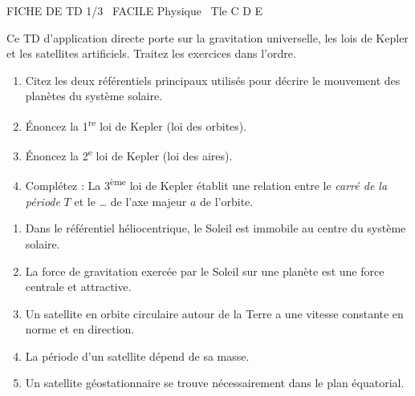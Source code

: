 \documentclass[11pt]{article}
\begin{document}
\begin{tcolorbox}[enhanced,colback=popink,colframe=popink,arc=10pt,boxrule=0pt,left=12pt,right=12pt,top=9pt,bottom=9pt]
{\color{white}\popxbold\small FICHE DE TD 1/3 \textbullet\ FACILE \hfill Physique \textbullet\ Tle C D E\par}
\end{tcolorbox}
\vspace{4pt}
Ce TD d'application directe porte sur la gravitation universelle, les lois de Kepler et les satellites artificiels. Traitez les exercices dans l'ordre.

\begin{exercice}
\begin{enumerate}
    \item Citez les deux référentiels principaux utilisés pour décrire le mouvement des planètes du système solaire.
    \item Énoncez la 1\textsuperscript{re} loi de Kepler (loi des orbites).
    \item Énoncez la 2\textsuperscript{e} loi de Kepler (loi des aires).
    \item Complétez : La 3\textsuperscript{ème} loi de Kepler établit une relation entre le \textit{carré de la période} $T$ et le \textit{\dots} de l'axe majeur $a$ de l'orbite.
\end{enumerate}
\end{exercice}

\begin{exercice}
\begin{enumerate}
    \item Dans le référentiel héliocentrique, le Soleil est immobile au centre du système solaire.
    \item La force de gravitation exercée par le Soleil sur une planète est une force centrale et attractive.
    \item Un satellite en orbite circulaire autour de la Terre a une vitesse constante en norme et en direction.
    \item La période d'un satellite dépend de sa masse.
    \item Un satellite géostationnaire se trouve nécessairement dans le plan équatorial.
\end{enumerate}
\end{exercice}
\end{document}
